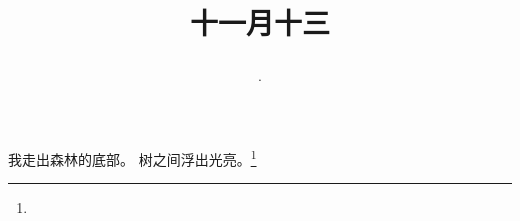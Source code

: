 \title{\date[d=13,m=12,y=2024][year:cn-y,年,month:cn,day:cn,日,·,weekday]·十一月十三 }
我走出森林的底部。 树之间浮出光亮。\footnote{ }

